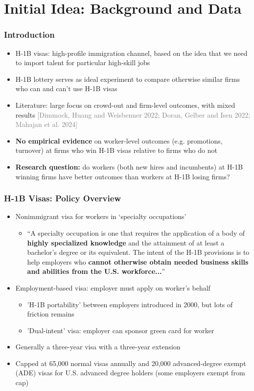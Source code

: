 \documentclass[xcolor=dvipsnames, compress, 12pt, aspectratio=169, handout]{beamer}
\begin{document}
\section{Initial Idea: Background and Data}
\begin{frame}
    \frametitle{Introduction}
    \begin{itemize}
        \item H-1B visas: high-profile immigration channel, based on the idea that we need to import talent for particular high-skill jobs
        \item H-1B lottery serves as ideal experiment to compare otherwise similar firms who can and can't use H-1B visas
        \item Literature: large focus on crowd-out and firm-level outcomes, with mixed results \textcolor{gray}{\footnotesize[Dimmock, Huang and Weisbenner 2022; Doran, Gelber and Isen 2022; Mahajan et al. 2024]}  \hyperlink{h1blit}{}
        \item \textbf{No empirical evidence} on worker-level outcomes (e.g. promotions, turnover) at firms who win H-1B visas relative to firms who do not
        \item \textbf{Research question:} do workers (both new hires and incumbents) at H-1B winning firms have better outcomes than workers at H-1B losing firms?
    \end{itemize}
\end{frame}

\begin{frame}
    \frametitle{H-1B Visas: Policy Overview}
    \begin{itemize}
        \item Nonimmigrant visa for workers in `specialty occupations' 
        \begin{itemize}
            \item ``A specialty occupation is one that requires the application of a body of \textbf{highly specialized knowledge} and the attainment of at least a bachelor’s degree or its equivalent. The intent of the H-1B provisions is to help employers who \textbf{cannot otherwise obtain needed business skills and abilities from the U.S. workforce...}''
        \end{itemize}
        \item Employment-based visa: employer must apply on worker's behalf
        \begin{itemize}
            \item 'H-1B portability' between employers introduced in 2000, but lots of friction remains
            \item 'Dual-intent' visa: employer can sponsor green card for worker 
        \end{itemize}
        \item Generally a three-year visa with a three-year extension
        \item Capped at 65,000 normal visas annually and 20,000 advanced-degree exempt (ADE) visas for U.S. advanced degree holders (some employers exempt from cap)
    \end{itemize}
\end{frame}%
\end{document}
